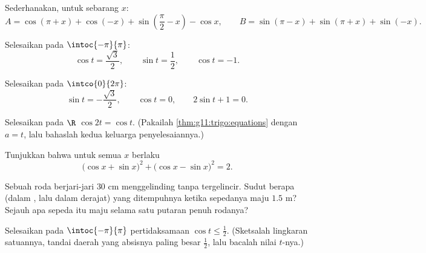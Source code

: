 \begin{exercise}[$\star\star$]\label{exo:g11:trigo:5}
Sederhanakan, untuk sebarang  $x$:
\[
A = \cos(\pi + x) + \cos(-x) + \sin\left(\frac\pi2 - x\right) - \cos x,
\qquad
B = \sin(\pi - x) + \sin(\pi + x) + \sin(-x) .
\]
\end{exercise}

\begin{exercise}[$\star\star$]\label{exo:g11:trigo:6}
Selesaikan pada $\intoc{-\pi}{\pi}$:
\[
\cos t = \frac{\sqrt3}{2}, \qquad
\sin t = \frac12, \qquad
\cos t = -1 .
\]
\end{exercise}

\begin{exercise}[$\star\star$]\label{exo:g11:trigo:7}
Selesaikan pada $\intco{0}{2\pi}$:
\[
\sin t = -\frac{\sqrt3}{2}, \qquad
\cos t = 0, \qquad
2\sin t + 1 = 0 .
\]
\end{exercise}

\begin{exercise}[$\star\star$]\label{exo:g11:trigo:8}
Selesaikan pada $\R$  $\cos 2t = \cos t$. (Pakailah
\cref{thm:g11:trigo:equations} dengan $a = t$, lalu bahaslah kedua keluarga
penyelesaiannya.)
\end{exercise}

\begin{exercise}[$\star\star$]\label{exo:g11:trigo:9}
Tunjukkan bahwa untuk semua  $x$ berlaku
\[
\bigl(\cos x + \sin x\bigr)^2 + \bigl(\cos x - \sin x\bigr)^2 = 2 .
\]
\end{exercise}

\begin{exercise}[$\star\star$]\label{exo:g11:trigo:10}
Sebuah roda berjari-jari $30$ cm menggelinding tanpa tergelincir. Sudut berapa
(dalam , lalu dalam derajat) yang ditempuhnya ketika sepedanya maju
$1.5$ m? Sejauh apa sepeda itu maju selama satu putaran penuh rodanya?
\end{exercise}

\begin{exercise}[$\star\star\star$]\label{exo:g11:trigo:11}
Selesaikan pada $\intoc{-\pi}{\pi}$ pertidaksamaan
$\cos t \leq \frac12$. (Sketsalah lingkaran satuannya, tandai daerah yang
absisnya paling besar $\frac12$, lalu bacalah  nilai
$t$-nya.)
\end{exercise}

